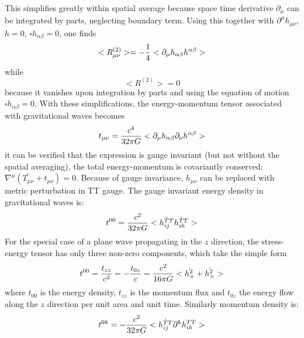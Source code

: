 \documentclass[binding=0.6cm, LaM]{sapthesis}
\begin{document}
This simplifies greatly within spatial average because space time derivative $\partial_\mu$ can be integrated by parts, neglecting boundary term. Using this together with $\partial^{\mu} h_{\mu\nu}$, $h=0$, $\square h_{\alpha \beta} = 0$, one finds
\begin{equation}
<R^{(2)}_{\mu\nu}> = -{1 \over 4}<{\partial_{\mu}h_{\alpha\beta}h^{\alpha\beta}}> 
\end{equation}
while
\begin{equation}
<R^{(2)}> = 0
\end{equation}
because it vanishes upon integration by parts and using the equation of motion ${\square h_{\alpha\beta}}=0$.
With these simplifications, the energy-momentum tensor associated with gravitational waves becomes
\begin{equation}
t_{\mu\nu} = {c^4 \over {32\pi G}}<\partial_{\mu}h_{\alpha\beta}\partial_{\nu}h^{\alpha\beta}>
\end{equation}
it can be verified that the expression is gauge invariant (but not without the spatial averaging), the total energy-momentum is covariantly conserved: $\nabla^{\mu}(\bar{T_{\mu\nu}}+t_{\mu\nu})=0$.
Because of gauge invariance, $h_{\mu\nu}$ can be replaced with metric perturbation in TT gauge.
The gauge invariant energy density in gravitational waves is:
\begin{equation}
t^{00} = {c^2\over{32\pi G}}<\dot{h_{ij}^{TT}}\dot{h_{ih}^{TT}}>
\end{equation}
For the special case of a plane wave propagating in the $z$ direction, the stress-energy tensor has only three non-zero components, which take the simple form
\begin{equation}
t^{00} = {t_{zz}\over c^2}= -{t_{0z}\over c}= {c^2\over{16\pi G}}<\dot{h_{+}^2}+\dot{h_{\times}^2}>
\end{equation}
where $t_{00}$ is the energy density, $t_{zz}$ is the momentum flux and $t_{0z}$ the energy flow along the $z$ direction per unit area and unit time. 
Similarly momentum density is:
\begin{equation}
t^{0k} = -{c^2\over{32\pi G}}<\dot{h_{ij}^{TT}}\partial^k{h_{ih}^{TT}}>
\end{equation}
\end{document}
